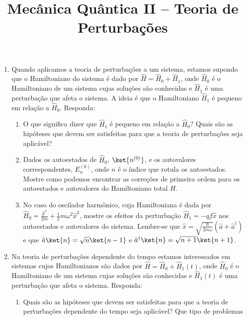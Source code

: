 \newif\ifuseseminar
\useseminartrue


\title{Mecânica Quântica II -- Teoria de Perturbações}


\begin{enumerate}
	\item Quando aplicamos a teoria de perturbações a um sistema, estamos supondo que o
	      Hamiltoniano do sistema é dado por $\hat{H} = \hat{H}_0 + \hat{H}_1$, onde
	      $\hat{H}_0$ é o Hamiltoniano de um sistema cujas soluções são conhecidas e
	      $\hat{H}_1$ é uma perturbação que afeta o sistema. A ideia é que o
	      Hamiltoniano $\hat{H}_1$ é pequeno em relação a $\hat{H}_0$. Responda:
	      \begin{enumerate}
		      \item O que significa dizer que $\hat{H}_1$ é pequeno em relação a
		            $\hat{H}_0$? Quais são as hipóteses que devem ser satisfeitas para
		            que a teoria de perturbações seja aplicável?
		      \item Dados os autoestados de $\hat{H}_0$, $\ket{n^{(0)}}$, e os
		            autovalores correspondentes, $E_n^{(0)}$, onde $n$ é o índice que
		            rotula os autoestados. Mostre como podemos encontrar as correções
		            de primeira ordem para os autoestados e autovalores do Hamiltoniano
		            total $H$.
		      \item No caso do oscilador harmônico, cuja Hamiltoniana é dada por
		            $\hat{H}_0 = \frac{\hat{p}^2}{2m} + \frac{1}{2}m\omega^2 \hat{x}^2$,
		            mostre os efeitos da perturbação $\hat{H}_1 =  -qf\hat{x}$ nos
		            autoestados e autovalores do sistema. Lembre-se que $\hat{x} =
			            \sqrt{\frac{\hbar}{2m\omega}}(\hat{a} + \hat{a}^\dagger)$ e que
		            $\hat{a}\ket{n} = \sqrt{n}\ket{n-1}$ e $\hat{a}^\dagger\ket{n} =
			            \sqrt{n+1}\ket{n+1}$.
	      \end{enumerate}
	\item Na teoria de perturbações dependente do tempo estamos interessados em sistemas
	      cujos Hamiltonianos são dados por $\hat{H} = \hat{H}_0 + \hat{H}_1(t)$, onde
	      $\hat{H}_0$ é o Hamiltoniano de um sistema cujas soluções são conhecidas e
	      $\hat{H}_1(t)$ é uma perturbação que afeta o sistema. Responda:
	      \begin{enumerate}
		      \item Quais são as hipóteses que devem ser satisfeitas para que a teoria de
		            perturbações dependente do tempo seja aplicável? Que tipo de problemas

\end{enumerate}
\end{enumerate}
